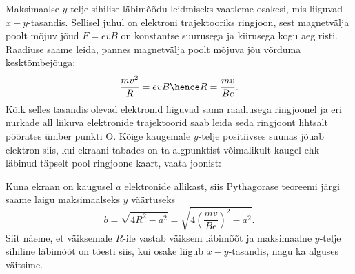 \documentclass[11pt, twoside]{article}
\begin{document}
{{\ifSolution
Maksimaalse $y$-telje sihilise läbimõõdu leidmiseks vaatleme osakesi, mis liiguvad $x-y$-tasandis. Sellisel juhul on elektroni trajektooriks ringjoon, sest magnetvälja poolt mõjuv jõud $F=evB$ on konstantse suurusega ja kiirusega kogu aeg risti. Raadiuse saame leida, pannes magnetvälja poolt mõjuva jõu võrduma kesktõmbejõuga:
$$\frac{mv^2}{R}=evB \hence R = \frac{mv}{Be}.$$
Kõik selles tasandis olevad elektronid liiguvad sama raadiusega ringjoonel ja eri nurkade all liikuva elektronide trajektoorid saab leida seda ringjoont lihtsalt pöörates ümber punkti O. Kõige kaugemale $y$-telje positiivses suunas jõuab elektron siis, kui ekraani tabades on ta algpunktist võimalikult kaugel ehk läbinud täpselt pool ringjoone kaart, vaata joonist:
\begin{center}
\end{center}

Kuna ekraan on kaugusel $a$ elektronide allikast, siis Pythagorase teoreemi järgi saame laigu maksimaalseks $y$ väärtuseks $$b=\sqrt{4R^2-a^2} = \sqrt{4\left(\frac{mv}{Be}\right)^2-a^2}.$$
Siit näeme, et väiksemale $R$-ile vastab väiksem läbimõõt ja maksimaalne $y$-telje sihiline läbimõõt on tõesti siis, kui osake liigub $x-y$-tasandis, nagu ka alguses väitsime.

}}
\end{document}
